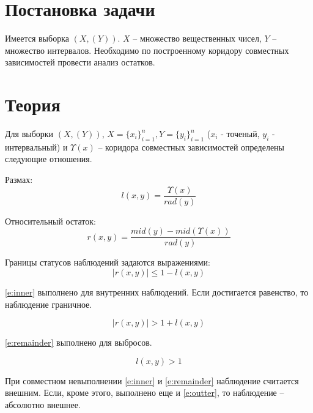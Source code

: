 \documentclass[a4paper,12pt]{article}
\begin{document}
    
    \newpage

    \tableofcontents
    \listoffigures
    \newpage

    \section{Постановка задачи}
    \quad Имеется выборка $ (X, (Y)) $. $ X $ -- множество вещественных чисел,
    $ Y $ -- множество интервалов. Необходимо по построенному коридору совместных зависимостей провести анализ остатков.
    
    \section{Теория}
    \quad Для выборки $ (X, (Y))$, $ X = \{x_i\}_{i=1}^{n}, {Y} = \{{y}_i\}_{i=1}^{n} $
    ($ x_i $ - точеный, $ {y}_i $ - интервальный) и $ \Upsilon(x) $ -- коридора совместных зависимостей определены следующие отношения.

    Размах:
    \begin{equation}
        l(x, y) = \frac{\Upsilon(x)}{rad(y)}
    \end{equation}

    Относительный остаток:
    \begin{equation}
        r(x, y) = \frac{mid(y) - mid(\Upsilon(x))}{rad(y)}
    \end{equation}

    Границы статусов наблюдений задаются выражениями:
    \begin{equation}
        |r(x, y)| \leq 1 - l(x, y)
        \label{e:inner}
    \end{equation}

    \ref{e:inner} выполнено для внутренних наблюдений. Если достигается равенство, то наблюдение граничное.
    
    \begin{equation}
        |r(x, y)| > 1 + l(x, y)
        \label{e:remainder}
    \end{equation}

     \ref{e:remainder} выполнено для выбросов.
    
    \begin{equation}
        l(x, y) > 1
        \label{e:outter}
    \end{equation}
    
    При совместном невыполнении \ref{e:inner} и \ref{e:remainder} наблюдение
    считается внешним. Если, кроме этого, выполнено еще и \ref{e:outter}, то
    наблюдение -- абсолютно внешнее.
\end{document}

